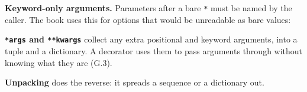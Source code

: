 \label{44-appendices:g2-functions-arguments-and-unpacking}

\textbf{Keyword-only arguments.} Parameters after a bare \texttt{*} must be named by the caller. The book uses this for options that would be unreadable as bare values:

\begin{codebox}[short]

\begin{Shaded}
\begin{Highlighting}[]
\NormalTok{, }\OperatorTok{*} \OperatorTok{=} \NormalTok{) }\OperatorTok{{-}\textgreater{}}  \OperatorTok{|} 

\OperatorTok{=}\NormalTok{)  }
\NormalTok{, }\NormalTok{)  }
\end{Highlighting}
\end{Shaded}

\end{codebox}

\noindent{}\textbf{\texttt{*args} and \texttt{**kwargs}} collect any extra positional and keyword arguments, into a tuple and a dictionary. A decorator uses them to pass arguments through without knowing what they are (G.3).

\textbf{Unpacking} does the reverse: it spreads a sequence or a dictionary out.

\begin{codebox}[short]

\begin{Shaded}
\begin{Highlighting}[]
\OperatorTok{=}
\OperatorTok{*}\OperatorTok{+} \NormalTok{))  }

\OperatorTok{=}\NormalTok{ \{}\NormalTok{: }\NormalTok{, }\NormalTok{: }\NormalTok{\}}
\OperatorTok{=}\NormalTok{ \{}\OperatorTok{**}\NormalTok{: }\NormalTok{\}  }
\end{Highlighting}
\end{Shaded}

\end{codebox}

